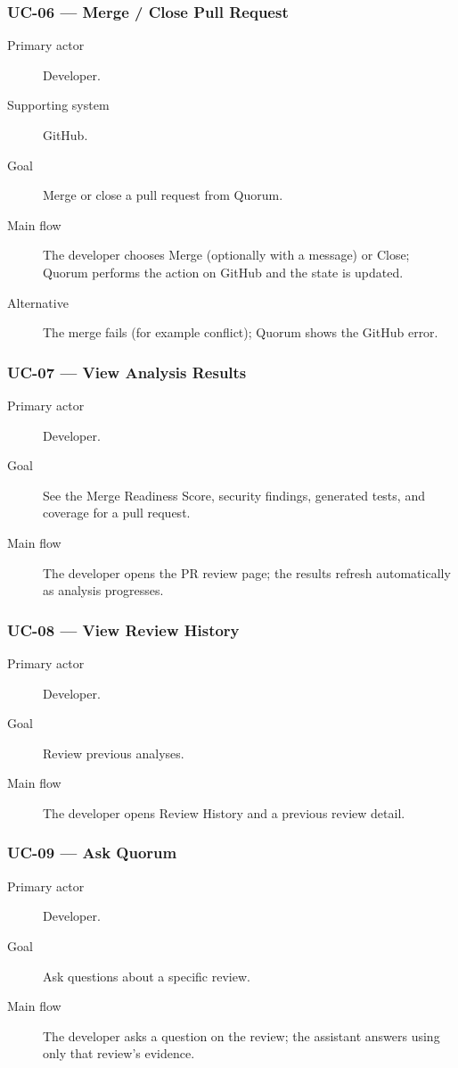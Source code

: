 \subsubsection{UC-06 --- Merge / Close Pull Request}
\begin{description}
  \item[Primary actor] Developer.
  \item[Supporting system] GitHub.
  \item[Goal] Merge or close a pull request from Quorum.
  \item[Main flow] The developer chooses Merge (optionally with a message) or
        Close; Quorum performs the action on GitHub and the state is updated.
  \item[Alternative] The merge fails (for example conflict); Quorum shows the
        GitHub error.
\end{description}

\subsubsection{UC-07 --- View Analysis Results}
\begin{description}
  \item[Primary actor] Developer.
  \item[Goal] See the Merge Readiness Score, security findings, generated
        tests, and coverage for a pull request.
  \item[Main flow] The developer opens the PR review page; the results refresh
        automatically as analysis progresses.
\end{description}

\subsubsection{UC-08 --- View Review History}
\begin{description}
  \item[Primary actor] Developer.
  \item[Goal] Review previous analyses.
  \item[Main flow] The developer opens Review History and a previous review
        detail.
\end{description}

\subsubsection{UC-09 --- Ask Quorum}
\begin{description}
  \item[Primary actor] Developer.
  \item[Goal] Ask questions about a specific review.
  \item[Main flow] The developer asks a question on the review; the assistant
        answers using only that review's evidence.
\end{description}

